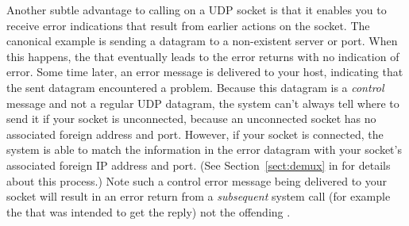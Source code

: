 Another subtle advantage to calling  on a UDP
socket is that it 
enables you to receive error indications that result from earlier actions
on the socket.  The canonical example is sending a datagram to a
non-existent server or port.  When this happens, the  that
eventually leads to the error returns with no indication of error.
Some time later, an error message is delivered to your host,
indicating that the sent datagram encountered a problem.
Because this datagram is a \emph{control\/} message and not a regular
UDP datagram, the system can't always tell where to send it if your
socket is unconnected, because an unconnected socket has no
associated foreign address and port.
However, if your socket is connected, the system is able to match the
information in the error datagram with your socket's associated foreign IP
address and port. (See Section~\ref{sect:demux} in for details about this process.)
Note such a control error message being delivered
to your socket will result in
an error return from a \emph{subsequent\/}
system call (for example the
 that was intended to get the reply)
not the offending .

